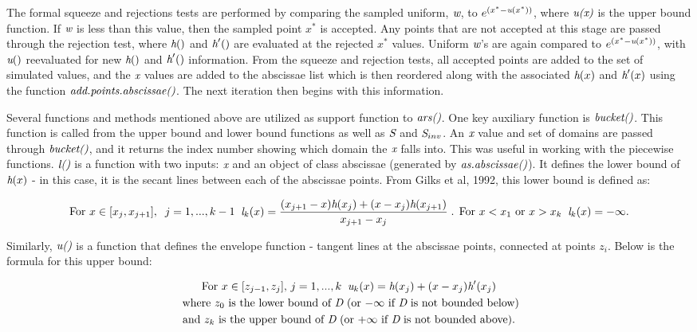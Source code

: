 \documentclass{article}\usepackage[]{graphicx}\usepackage[]{color}
\begin{document}
The formal squeeze and rejections tests are performed by comparing the sampled uniform, $\emph{w}$, to $e^{( x^{*} - \emph{u}(x^{*}) )}$, where $\emph{u(x)}$ is the upper bound function.  If $\emph{w}$ is less than this value, then the sampled point $x^{*}$ is accepted.  Any points that are not accepted at this stage are passed through the rejection test, where $\emph{h}()$ and $\emph{h}'()$ are evaluated at the rejected $x^{*}$ values.  Uniform $\emph{w}$'s are again compared to $e^{( x^{*} - \emph{u}(x^{*}) )}$, with $\emph{u}()$ reevaluated for new $\emph{h}()$ and $\emph{h}'()$ information.  From the squeeze and rejection tests, all accepted points are added to the set of simulated values, and the $\emph{x}$ values are added to the abscissae list which is then reordered along with the associated $\emph{h}(x)$ and $\emph{h}'(x)$ using the function $\emph{add.points.abscissae()}$.  The next iteration then begins with this information.

Several functions and methods mentioned above are utilized as support function to $\emph{ars()}$.  One key auxiliary function is $\emph{bucket()}$. This function is called from the upper bound and lower bound functions as well as $\emph{S}$ and $\emph{S}_{inv}$.  An $\emph{x}$ value and set of domains are passed through $\emph{bucket()}$, and it returns the index number showing which domain the $\emph{x}$ falls into.  This was useful in working with the piecewise functions. $\emph{l()}$ is a function with two inputs: $\emph{x}$ and an object of class abscissae (generated by $\emph{as.abscissae()}$).  It defines the lower bound of $\emph{h}(x)$ - in this case, it is the secant lines between each of the abscissae points.  From Gilks et al, 1992, this lower bound is defined as:

\begin{gather*}
\text{For } x \in [x_{j}, x_{j+1}], \; \; j = 1, ..., k-1 \; \; 
\emph{l}_{k}(x) = \frac{(x_{j+1} - x)\emph{h}(x_{j}) + (x - x_{j})\emph{h}(x_{j+1})}{x_{j+1} - x_{j}} \;
\text{. For } x < x_{1} \text{ or } x > x_{k} \; \;  \emph{l}_{k}(x) = -\infty.
\end{gather*}


Similarly, $\emph{u()}$ is a function that defines the envelope function - tangent lines at the abscissae points, connected at points $z_i$.  Below is the formula for this upper bound:


\begin{gather*}
\text{For } x \in [z_{j-1}, z_{j}] \text{,  } j = 1, ..., k \; \;
\emph{u}_{k}(x) = \emph{h}(x_{j}) + (x - x_{j})\emph{h}'(x_{j}) \\
\text{ where $z_{0}$ is the lower bound of $\emph{D}$ (or $-\infty$ if $\emph{D}$ is not bounded below)} \\ \text{and $z_{k}$ is the upper bound of $\emph{D}$ (or $+\infty$ if $\emph{D}$ is not bounded above).}
\end{gather*}
\end{document}
